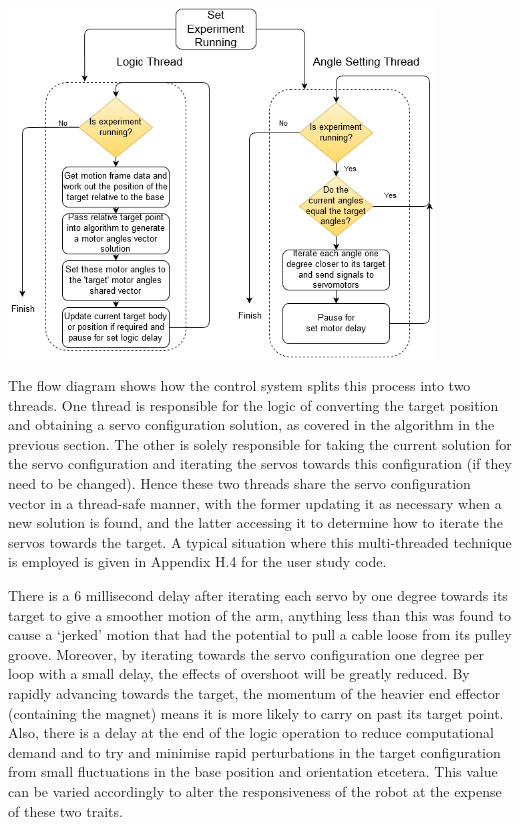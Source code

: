 \documentclass[11pt]{article}
\begin{document}
\begin{center}
\includegraphics[width=0.85\textwidth]{images/separateThreads2.png}
\label{figure:separateThreads}
\end{center}

The flow diagram shows how the control system splits this process into two threads. One thread is responsible for the logic of converting the target position and obtaining a servo configuration solution, as covered in the algorithm in the previous section. The other is solely responsible for taking the current solution for the servo configuration and iterating the servos towards this configuration (if they need to be changed). Hence these two threads share the servo configuration vector in a thread-safe manner, with the former updating it as necessary when a new solution is found, and the latter accessing it to determine how to iterate the servos towards the target. A typical situation where this multi-threaded technique is employed is given in Appendix H.4 for the user study code.

There is a 6 millisecond delay after iterating each servo by one degree towards its target to give a smoother motion of the arm, anything less than this was found to cause a `jerked' motion that had the potential to pull a cable loose from its pulley groove. Moreover, by iterating towards the servo configuration one degree per loop with a small delay, the effects of overshoot will be greatly reduced. By rapidly advancing towards the target, the momentum of the heavier end effector (containing the magnet) means it is more likely to carry on past its target point. Also, there is a delay at the end of the logic operation to reduce computational demand and to try and minimise rapid perturbations in the target configuration from small fluctuations in the base position and orientation etcetera. This value can be varied accordingly to alter the responsiveness of the robot at the expense of these two traits. 
\end{document}
